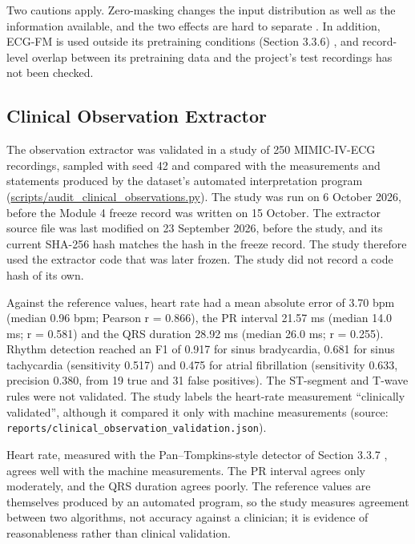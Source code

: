 Two cautions apply. Zero-masking changes the input distribution as well as the information available, and the two effects are hard to separate \cite{HOOKER2019ROAR}. In addition, ECG-FM is used outside its pretraining conditions (Section 3.3.6) \cite{MCKEEN2025ECGFM}, and record-level overlap between its pretraining data and the project's test recordings has not been checked.

\subsection{Clinical Observation Extractor}\label{sec:ch4_4_8}

The observation extractor was validated in a study of 250 MIMIC-IV-ECG recordings, sampled with seed 42 and compared with the measurements and statements produced by the dataset's automated interpretation program (\url{scripts/audit_clinical_observations.py}). The study was run on 6 October 2026, before the Module 4 freeze record was written on 15 October. The extractor source file was last modified on 23 September 2026, before the study, and its current SHA-256 hash matches the hash in the freeze record. The study therefore used the extractor code that was later frozen. The study did not record a code hash of its own.

Against the reference values, heart rate had a mean absolute error of 3.70 bpm (median 0.96 bpm; Pearson r = 0.866), the PR interval 21.57 ms (median 14.0 ms; r = 0.581) and the QRS duration 28.92 ms (median 26.0 ms; r = 0.255). Rhythm detection reached an F1 of 0.917 for sinus bradycardia, 0.681 for sinus tachycardia (sensitivity 0.517) and 0.475 for atrial fibrillation (sensitivity 0.633, precision 0.380, from 19 true and 31 false positives). The ST-segment and T-wave rules were not validated. The study labels the heart-rate measurement ``clinically validated'', although it compared it only with machine measurements (source: \texttt{reports/clinical\_observation\_validation.json}).



Heart rate, measured with the Pan–Tompkins-style detector of Section 3.3.7 \cite{PAN1985QRS}, agrees well with the machine measurements. The PR interval agrees only moderately, and the QRS duration agrees poorly. The reference values are themselves produced by an automated program, so the study measures agreement between two algorithms, not accuracy against a clinician; it is evidence of reasonableness rather than clinical validation.

